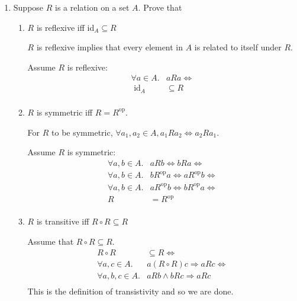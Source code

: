 \documentclass[10pt,\jkfside,a4paper]{article}
\begin{document}
\begin{enumerate}
\item Suppose $R$ is a relation on a set $A$. Prove that

\begin{enumerate}

\item $R$ is reflexive iff id$_A \subseteq R$

$R$ is reflexive implies that every element in $A$ is related to itself under $R$.

Assume $R$ is reflexive:
\begin{equation}
\begin{split}
\forall a \in A. &a R a \Longleftrightarrow \\
\text{ id}_A &\subseteq R \\
\end{split}
\end{equation}

\item $R$ is symmetric iff $R = R^{\text{op}}$.

For $R$ to be symmetric, $\forall a_1, a_2 \in A, a_1 R a_2 \Longleftrightarrow a_2 R a_1$.

Assume $R$ is symmetric:
\begin{equation}
\begin{split}
\forall a, b \in A.& a R b \Longleftrightarrow b R a \Longleftrightarrow \\
\forall a, b \in A.& b R^{\text{op}} a \Longleftrightarrow a R^{\text{op}} b \Longleftrightarrow \\
\forall a, b \in A.& a R^{\text{op}} b \Longleftrightarrow b R^{\text{op}} a \Longleftrightarrow \\
R &= R^{\text{op}} \\
\end{split}
\end{equation}

\item $R$ is transitive iff $R \circ R \subseteq R$

Assume that $R \circ R \subseteq R$.
\begin{equation}
\begin{split}
R \circ R &\subseteq R \Longleftrightarrow \\
\forall a, c \in A.& a (R \circ R) c \Longrightarrow a R c \Longleftrightarrow \\
\forall a, b, c \in A. &a R b \wedge b R c \Longrightarrow a R c \\
\end{split}
\end{equation}
This is the definition of transistivity and so we are done.


\end{enumerate}
\end{enumerate}
\end{document}
